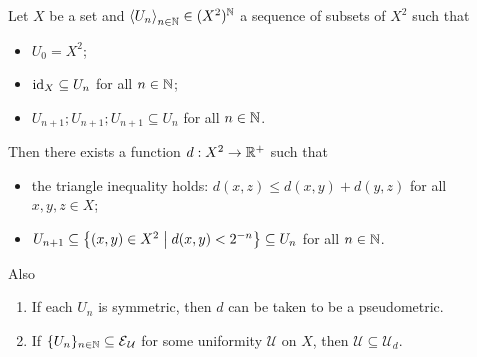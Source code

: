 \begin{lemma} \label{metrisationLemma}
Let $X$ be a set and $\left\langle U_n \right\rangle_{n\in \mathbb{N}}\in (X^2)^{\mathbb{N}}$ a sequence of subsets of $X^2$ such that
\begin{itemize}
\item $U_0 = X^2$;
\item $\operatorname{id}_X \subseteq U_n$ for all $n\in\mathbb{N}$;
\item $U_{n+1};U_{n+1};U_{n+1} \subseteq U_n$ for all $n\in\mathbb{N}$.
\end{itemize}
Then there exists a function $d: X^2 \to \mathbb{R}^+$ such that
\begin{itemize}
\item the triangle inequality holds: $d(x,z) \leq d(x,y)+d(y,z)$ for all $x,y,z\in X$;
\item $U_{n+1} \subseteq \setbuilder{(x,y)\in X^2}{d(x,y)< 2^{-n}} \subseteq U_{n}$ for all $n\in\mathbb{N}$.
\end{itemize}
Also
\begin{enumerate}
\item If each $U_n$ is symmetric, then $d$ can be taken to be a pseudometric.
\item If $\{U_n\}_{n\in\mathbb{N}} \subseteq \operatorname{\mathcal{E}}_\mathcal{U}$ for some uniformity $\mathcal{U}$ on $X$, then $\mathcal{U} \subseteq \mathcal{U}_d$.
\end{enumerate}
\end{lemma}
